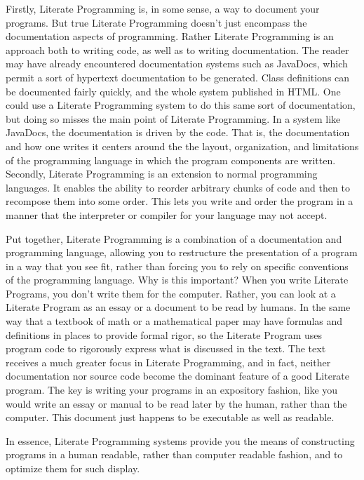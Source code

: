 Firstly, Literate Programming is, in some sense, a way to document
your programs.  But true Literate Programming doesn't just encompass
the documentation aspects of programming.  Rather Literate Programming
is an approach both to writing code, as well as to writing
documentation.  The reader may have already encountered documentation
systems such as JavaDocs, which permit a sort of hypertext
documentation to be generated.  Class definitions can be documented
fairly quickly, and the whole system published in HTML.  One could use
a Literate Programming system to do this same sort of documentation,
but doing so misses the main point of Literate Programming.  In a
system like JavaDocs, the documentation is driven by the code.  That
is, the documentation and how one writes it centers around the the
layout, organization, and limitations of the programming language in
which the program components are written.  Secondly, Literate
Programming is an extension to normal programming languages.  It
enables the ability to reorder arbitrary chunks of code and then to
recompose them into some order.  This lets you write and order the
program in a manner that the interpreter or compiler for your language
may not accept.

Put together, Literate Programming is a combination of a documentation
and programming language, allowing you to restructure the presentation
of a program in a way that you see fit, rather than forcing you to
rely on specific conventions of the programming language.  Why is this
important?  When you write Literate Programs, you don't write them for
the computer.  Rather, you can look at a Literate Program as an essay
or a document to be read by humans.  In the same way that a textbook
of math or a mathematical paper may have formulas and definitions in
places to provide formal rigor, so the Literate Program uses program
code to rigorously express what is discussed in the text.  The text
receives a much greater focus in Literate Programming, and in fact,
neither documentation nor source code become the dominant feature of a
good Literate program.  The key is writing your programs in an
expository fashion, like you would write an essay or manual to be read
later by the human, rather than the computer.  This document just
happens to be executable as well as readable.

In essence, Literate Programming systems provide you the means of
constructing programs in a human readable, rather than computer
readable fashion, and to optimize them for such display.

